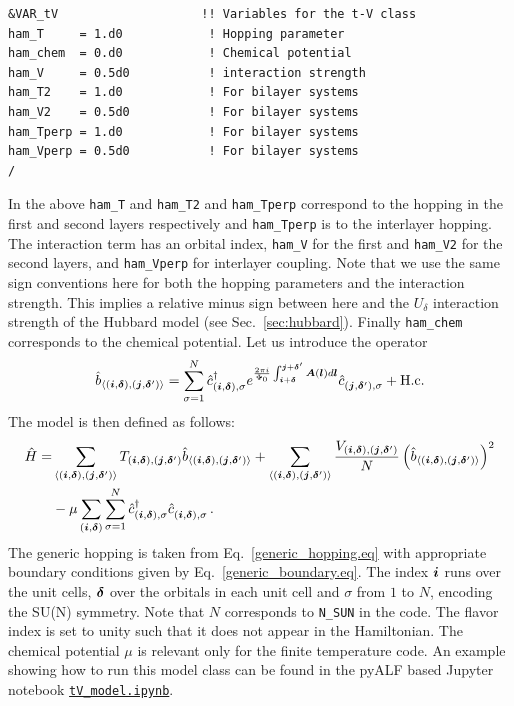 \begin{lstlisting}[style=fortran,escapechar=\#,breaklines=true]
&VAR_tV                    !! Variables for the t-V class
ham_T     = 1.d0            ! Hopping parameter
ham_chem  = 0.d0            ! Chemical potential
ham_V     = 0.5d0           ! interaction strength
ham_T2    = 1.d0            ! For bilayer systems
ham_V2    = 0.5d0           ! For bilayer systems
ham_Tperp = 1.d0            ! For bilayer systems
ham_Vperp = 0.5d0           ! For bilayer systems
/

\end{lstlisting}
In the above   \texttt{ham\_T} and \texttt{ham\_T2} and \texttt{ham\_Tperp}   correspond to the hopping in the first and second layers respectively and  \texttt{ham\_Tperp}   is to the interlayer hopping.   The interaction term has an orbital index, 
\texttt{ham\_V}  for the first and  \texttt{ham\_V2}  for the second layers,  and \texttt{ham\_Vperp} for interlayer coupling. Note that we use the same sign conventions here for both the hopping parameters and the interaction strength. This implies a relative minus sign between here and the $U_\delta$ interaction strength of the Hubbard model (see Sec.~\ref{sec:hubbard}).
Finally   \texttt{ham\_chem}  corresponds to the chemical potential. Let us introduce the operator
\begin{equation}
\hat{b}_{\langle (\boldsymbol{i},\boldsymbol{\delta}), (\boldsymbol{j},\boldsymbol{\delta}') \rangle} =  \sum_{\sigma =1}^{N}    \hat{c}^{\dagger}_{(\boldsymbol{i},\boldsymbol{\delta}), \sigma }   e^{\frac{2 \pi i}{\Phi_0} \int_{\boldsymbol{i} + \boldsymbol{\delta}}^{\boldsymbol{j} + \boldsymbol{\delta}'}  
	\boldsymbol{A}(\boldsymbol{l})  d \boldsymbol{l}} \hat{c}^{}_{(\boldsymbol{j},\boldsymbol{\delta}'),\sigma} 
+ \mathrm{H.c.}
\end{equation}
The model is then defined as follows:
\begin{align}
\hat{H}= & \sum_{\langle (\ve{i},\ve{\delta}), (\ve{j},\ve{\delta}') \rangle}   T_{(\ve{i},\ve{\delta}), (\ve{j},\ve{\delta}')}    \hat{b}_{\langle (\ve{i},\ve{\delta}), (\ve{j},\ve{\delta}') \rangle}
+ \sum_{\langle (\ve{i},\ve{\delta}), (\ve{j},\ve{\delta}') \rangle}  \frac{V_{(\ve{i},\ve{\delta}), (\ve{j},\ve{\delta}')}}{N} \left(  \hat{b}_{\langle (\ve{i},\ve{\delta}), (\ve{j},\ve{\delta}') \rangle}  \right)^2  \nonumber \\
& - \mu \sum_{(\ve{i},\ve{\delta})}  \sum_{\sigma =1}^{N} \hat{c}^{\dagger}_{(\vec{i},\ve{\delta}),\sigma } \hat{c}^{\phantom\dagger}_{(\vec{i},\ve{\delta}),\sigma } \,.
\end{align}
The generic hopping is taken from Eq.~\eqref{generic_hopping.eq} with appropriate boundary conditions given by Eq.~\eqref{generic_boundary.eq}. The index $\boldsymbol{i}$ runs over the unit cells, $\boldsymbol{\delta}$ over the orbitals in each unit cell and $\sigma$  from $1$ to $N$,  encoding the SU(N) symmetry.
Note that $N$ corresponds to \texttt{N\_SUN}  in the code.
The flavor index is set to unity such that it does not appear in the  Hamiltonian.
The chemical potential $\mu$ is relevant only for the finite temperature code.
An example showing how to run this model class can be found in the pyALF based Jupyter notebook   
\href{https://github.com/ALF-QMC/pyALF/blob/\pyALFbranch/Notebooks/tV_model.ipynb}{\texttt{tV\_model.ipynb}}.

